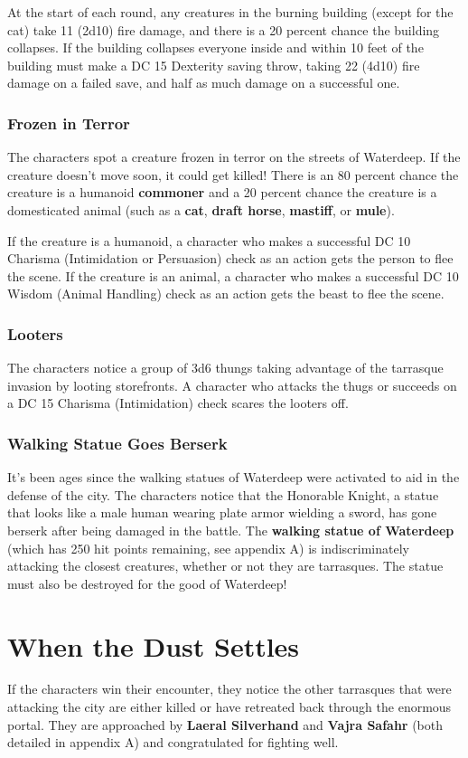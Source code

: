 \documentclass[10pt,a4paper,twoside,bg=print,twocolumn,openany,nodeprecatedcode]{dndbook}
\begin{document}
At the start of each round, any creatures in the burning building (except for the cat) take 11 (2d10) fire damage, and there is a 20 percent chance the building collapses. If the building collapses everyone inside and within 10 feet of the building must make a DC 15 Dexterity saving throw, taking 22 (4d10) fire damage on a failed save, and half as much damage on a successful one.

\subsubsection{Frozen in Terror}
The characters spot a creature frozen in terror on the streets of Waterdeep. If the creature doesn't move soon, it could get killed! There is an 80 percent chance the creature is a humanoid \textbf{commoner} and a 20 percent chance the creature is a domesticated animal (such as a \textbf{cat}, \textbf{draft horse}, \textbf{mastiff}, or \textbf{mule}).

If the creature is a humanoid, a character who makes a successful DC 10 Charisma (Intimidation or  Persuasion) check as an action gets the person to flee the scene. If the creature is an animal, a character who makes a successful DC 10 Wisdom (Animal Handling) check as an action gets the beast to flee the scene.

\subsubsection{Looters}
The characters notice a group of 3d6 thungs taking advantage of the tarrasque invasion by looting storefronts. A character who attacks the thugs or succeeds on a DC 15 Charisma (Intimidation) check scares the looters off.

\subsubsection{Walking Statue Goes Berserk}
It's been ages since the walking statues of Waterdeep were activated to aid in the defense of the city. The characters notice that the Honorable Knight, a statue that looks like a male human wearing plate armor wielding a sword, has gone berserk after being damaged in the battle. The \textbf{walking statue of Waterdeep} (which has 250 hit  points remaining, see appendix A) is indiscriminately attacking the closest creatures, whether or not they are tarrasques. The statue must also be destroyed for the good of Waterdeep!

\section{When the Dust Settles}
If the characters win their encounter, they notice the other tarrasques that were attacking the city are either killed or have retreated back through the enormous portal. They are approached by \textbf{Laeral Silverhand} and \textbf{Vajra Safahr} (both detailed in  appendix A) and congratulated for fighting well.
\end{document}
